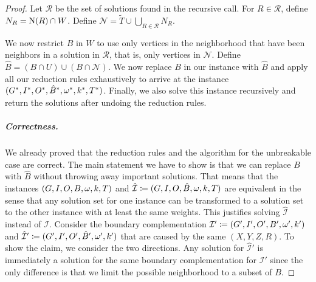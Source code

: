 \begin{theorem}
\begin{lemma}
\begin{theorem}
\begin{lemma}
\begin{reduction*}
\begin{reduction*}
\begin{reduction*}
\begin{reduction*}
\begin{lemma}
\begin{lemma}
\begin{theorem}
\begin{proof}
  Let $\mathcal{R}$ be the set of solutions found in the recursive call. For $R \in \mathcal{R}$, define $N_R = \operatorname{N}({R}) \cap W$. Define $\mathcal{N} = \tilde{T} \cup \bigcup_{R \in \mathcal{R}} N_R$. 

  We now restrict $B$ in $W$ to use only vertices in the neighborhood that have been neighbors in a solution in $\mathcal{R}$, that is, only vertices in $\mathcal{N}$. Define $\hat{B} = (B \cap U) \cup (B \cap \mathcal{N})$. We now replace $B$ in our instance with $\hat{B}$ and apply all our reduction rules exhaustively to arrive at the instance $(G^*, I^*, O^*, \hat{B}^*, \operatorname{\omega}^*, k^*, T^*)$. Finally, we also solve this instance recursively and return the solutions after undoing the reduction rules. 

  \subparagraph*{Correctness.}
  We already proved that the reduction rules and the algorithm for the unbreakable case are correct. The main statement we have to show is that we can replace $B$ with $\hat{B}$ without throwing away important solutions. That means that the instances $(G,I,O,B,\operatorname{\omega},k,T)$ and $\hat{\mathcal{I}} \coloneqq (G,I,O,\hat{B},\operatorname{\omega},k,T)$ are equivalent in the sense that any solution set for one instance can be transformed to a solution set to the other instance with at least the same weights. This justifies solving $\hat{\mathcal{I}}$ instead of $\mathcal{I}$.
  Consider the boundary complementation  $\mathcal{I}' \coloneqq (G',I',O',B',\operatorname{\omega}',k')$ and $\hat{\mathcal{I}}' \coloneqq (G',I',O',\hat{B}',\operatorname{\omega}',k')$ that are caused by the same $(X,Y,Z,R)$.
  To show the claim, we consider the two directions. Any solution for $\hat{\mathcal{I}}'$ is immediately a solution for the same boundary complementation for $\mathcal{I}'$ since the only difference is that we limit the possible neighborhood to a subset of $B$.


\end{proof}
\end{theorem}
\end{lemma}
\end{lemma}
\end{reduction*}
\end{reduction*}
\end{reduction*}
\end{reduction*}
\end{lemma}
\end{theorem}
\end{lemma}
\end{theorem}
